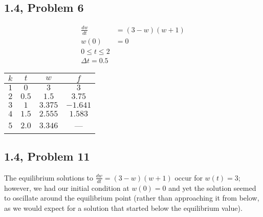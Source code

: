 \documentclass[12pt]{mypackage}
\begin{document}
\subsection{1.4, Problem 6}%
\begin{align*}
  \frac{dw}{dt} &= (3-w)(w+1)\\
  w(0) &= 0\\
  0 \leq t \leq 2\\
  \Delta t = 0.5
\end{align*}
\begin{center}
  \begin{tabular}{c|c|c|c}
    $k$ & $t$ & $w$ & $f$\\
    \hline
    $1$ & $0$ & $3$ & $3$\\
    $2$ & $0.5$ & $1.5$ & $3.75$\\
    $3$ & $1$ & $3.375$ & $-1.641$\\
    $4$ & $1.5$ & $2.555$ & $1.583$\\
    $5$ & $2.0$ & $3.346$ & ---
  \end{tabular}
\end{center}
\begin{center}
\end{center}
\subsection{1.4, Problem 11}%
The equilibrium solutions to $\frac{dw}{dt} = (3-w)(w+1)$ occur for $w(t) = 3$; however, we had our initial condition at $w(0) = 0$ and yet the solution seemed to oscillate around the equilibrium point (rather than approaching it from below, as we would expect for a solution that started below the equilibrium value).
\end{document}
